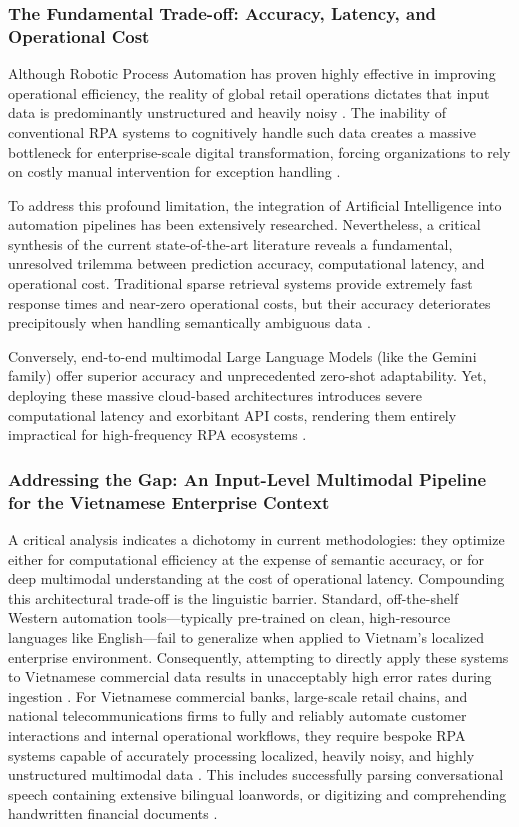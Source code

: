 \subsubsection{The Fundamental Trade-off: Accuracy, Latency, and Operational Cost}
Although Robotic Process Automation has proven highly effective in improving operational efficiency, the reality of global retail operations dictates that input data is predominantly unstructured and heavily noisy \parencite{gumber2025multimodal}. The inability of conventional RPA systems to cognitively handle such data creates a massive bottleneck for enterprise-scale digital transformation, forcing organizations to rely on costly manual intervention for exception handling \parencite{khan2025adaptive}.

To address this profound limitation, the integration of Artificial Intelligence into automation pipelines has been extensively researched. Nevertheless, a critical synthesis of the current state-of-the-art literature reveals a fundamental, unresolved trilemma between prediction accuracy, computational latency, and operational cost. Traditional sparse retrieval systems provide extremely fast response times and near-zero operational costs, but their accuracy deteriorates precipitously when handling semantically ambiguous data \parencite{reimers2019sentence}.

Conversely, end-to-end multimodal Large Language Models (like the Gemini family) offer superior accuracy and unprecedented zero-shot adaptability. Yet, deploying these massive cloud-based architectures introduces severe computational latency and exorbitant API costs, rendering them entirely impractical for high-frequency RPA ecosystems \parencite{reid2024gemini}.


\subsubsection{Addressing the Gap: An Input-Level Multimodal Pipeline for the Vietnamese Enterprise Context}
A critical analysis indicates a dichotomy in current methodologies: they optimize either for computational efficiency at the expense of semantic accuracy, or for deep multimodal understanding at the cost of operational latency. Compounding this architectural trade-off is the linguistic barrier. Standard, off-the-shelf Western automation tools—typically pre-trained on clean, high-resource languages like English—fail to generalize when applied to Vietnam's localized enterprise environment. Consequently, attempting to directly apply these systems to Vietnamese commercial data results in unacceptably high error rates during ingestion \parencite{khan2025adaptive}. For Vietnamese commercial banks, large-scale retail chains, and national telecommunications firms to fully and reliably automate customer interactions and internal operational workflows, they require bespoke RPA systems capable of accurately processing localized, heavily noisy, and highly unstructured multimodal data \parencite{peng2022digital}. This includes successfully parsing conversational speech containing extensive bilingual loanwords, or digitizing and comprehending handwritten financial documents \parencite{gumber2025multimodal}.


